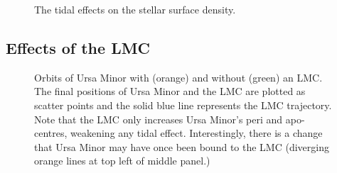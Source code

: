 \begin{figure}
\centering
{}
\caption[Ursa Minor simulated density profiles]{The tidal effects on the
stellar surface density.}
\end{figure}

\subsection{Effects of the LMC}\label{effects-of-the-lmc}

\begin{figure}
\centering
{}
\caption[Ursa Minor orbits with LMC]{Orbits of Ursa Minor with (orange)
and without (green) an LMC. The final positions of Ursa Minor and the
LMC are plotted as scatter points and the solid blue line represents the
LMC trajectory. Note that the LMC only increases Ursa Minor's peri and
apo-centres, weakening any tidal effect. Interestingly, there is a
change that Ursa Minor may have once been bound to the LMC (diverging
orange lines at top left of middle panel.)}
\end{figure}
